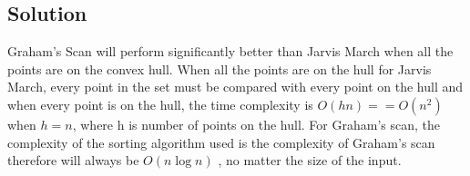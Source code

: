 \subsection*{Solution}
Graham's Scan will perform significantly better than Jarvis March when all the points are on the convex hull. When all the points are on the hull for Jarvis March, every point in the set must be compared with every point on the hull and when every point is on the hull, the time complexity is $O(hn) == O(n^2)$ when $h=n$, where h is number of points on the hull. For Graham's scan, the complexity of the sorting algorithm used is the complexity of Graham's scan therefore will always be $O(n \log n)$ , no matter the size of the input.
